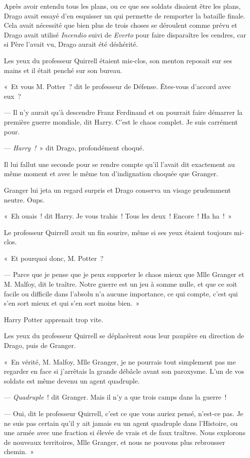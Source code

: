 Après avoir entendu tous les plans, ou ce que ses soldats disaient être les plans, Drago avait essayé d'en esquisser un qui permette de remporter la bataille finale. Cela avait nécessité que bien plus de trois choses se déroulent comme prévu et Drago avait utilisé \emph{Incendio} suivi de \emph{Everto} pour faire disparaître les cendres, car si Père l'avait vu, Drago aurait été déshérité.

Les yeux du professeur Quirrell étaient mis-clos, son menton reposait sur ses mains et il était penché sur son bureau.

«~Et vous M. Potter~? dit le professeur de Défense. Êtes-vous d'accord avec eux~?

--- Il n'y aurait qu'à descendre Franz Ferdinand et on pourrait faire démarrer la première guerre mondiale, dit Harry. C'est le chaos complet. Je suis carrément pour.

--- \emph{Harry~!}~» dit Drago, profondément choqué.

Il lui fallut une seconde pour se rendre compte qu'il l'avait dit exactement au même moment et avec le même ton d'indignation choquée que Granger.

Granger lui jeta un regard surpris et Drago conserva un visage prudemment neutre. Oups.

«~Eh ouais~! dit Harry. Je vous trahis~! Tous les deux~! Encore~! Ha ha~!~»

Le professeur Quirrell avait un fin sourire, même si ses yeux étaient toujours mi-clos.

«~Et pourquoi donc, M. Potter~?

--- Parce que je pense que je peux supporter le chaos mieux que Mlle Granger et M. Malfoy, dit le traître. Notre guerre est un jeu à somme nulle, et que ce soit facile ou difficile dans l'absolu n'a aucune importance, ce qui compte, c'est qui s'en sort mieux et qui s'en sort moins bien.~»

Harry Potter apprenait trop vite.

Les yeux du professeur Quirrell se déplacèrent sous leur paupière en direction de Drago, puis de Granger.

«~En vérité, M. Malfoy, Mlle Granger, je ne pourrais tout simplement pas me regarder en face si j'arrêtais la grande débâcle avant son paroxysme. L'un de vos soldats est même devenu un agent quadruple.

--- \emph{Quadruple}~! dit Granger. Mais il n'y a que trois camps dans la guerre~!

--- Oui, dit le professeur Quirrell, c'est ce que vous auriez pensé, n'est-ce pas. Je ne suis pas certain qu'il y ait jamais eu un agent quadruple dans l'Histoire, ou une armée avec une fraction si élevée de vrais et de faux traîtres. Nous explorons de nouveaux territoires, Mlle Granger, et nous ne pouvons plus rebrousser chemin.~»

